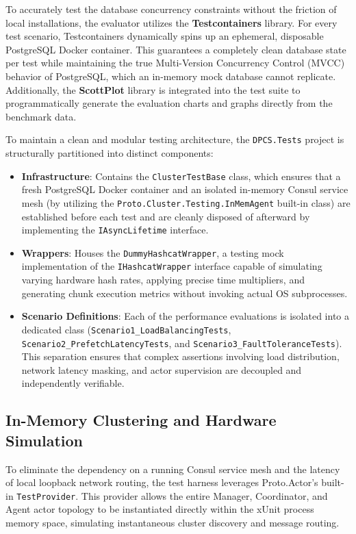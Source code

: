 To accurately test the database concurrency constraints without the friction of local installations, the evaluator utilizes the \textbf{Testcontainers} library. For every test scenario, Testcontainers \cite{testcontainers} dynamically spins up an ephemeral, disposable PostgreSQL Docker container. This guarantees a completely clean database state per test while maintaining the true Multi-Version Concurrency Control (MVCC) behavior of PostgreSQL, which an in-memory mock database cannot replicate. Additionally, the \textbf{ScottPlot} \cite{scottplot} library is integrated into the test suite to programmatically generate the evaluation charts and graphs directly from the benchmark data.

To maintain a clean and modular testing architecture, the \verb|DPCS.Tests| project is structurally partitioned into distinct components:
\begin{itemize}
    \item \textbf{Infrastructure}: Contains the \verb|ClusterTestBase| class, which ensures that a fresh PostgreSQL Docker container and an isolated in-memory Consul service mesh (by utilizing the \verb|Proto.Cluster.Testing.InMemAgent| built-in class) are established before each test and are cleanly disposed of afterward by implementing the \verb|IAsyncLifetime| interface.

    \item \textbf{Wrappers}: Houses the \verb|DummyHashcatWrapper|, a testing mock implementation of the \verb|IHashcatWrapper| interface capable of simulating varying hardware hash rates, applying precise time multipliers, and generating chunk execution metrics without invoking actual OS subprocesses.

    \item \textbf{Scenario Definitions}: Each of the performance evaluations is isolated into a dedicated class (\verb|Scenario1_LoadBalancingTests|, \verb|Scenario2_PrefetchLatencyTests|, and \verb|Scenario3_FaultToleranceTests|). This separation ensures that complex assertions involving load distribution, network latency masking, and actor supervision are decoupled and independently verifiable.
\end{itemize}

\subsection{In-Memory Clustering and Hardware Simulation}
To eliminate the dependency on a running Consul service mesh and the latency of local loopback network routing, the test harness leverages Proto.Actor's built-in \verb|TestProvider|. This provider allows the entire Manager, Coordinator, and Agent actor topology to be instantiated directly within the xUnit process memory space, simulating instantaneous cluster discovery and message routing.

